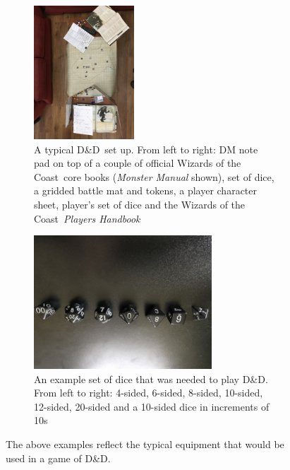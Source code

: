 \documentclass[final]{cmpreport}
\newcommand{\WotC}{Wizards of the Coast}
\newcommand{\dnd}{D\&D}
\begin{document}
			\begin{figure}[h] 
				\begin{subfigure}[t]{0.5\textwidth}
					\includegraphics[width=\linewidth, height=5cm, angle=180]{DnD_Live.jpg}
					\caption{A typical \dnd \ set up. From left to right: DM note pad on top of a couple of official \WotC \ core books (\emph{Monster Manual} shown), set of dice, a gridded battle mat and tokens, a player character sheet, player's set of dice and the \WotC \ \emph{Players Handbook}} \label{fig:DnDLive}
				\end{subfigure}
				\begin{subfigure}[t]{0.5\textwidth}
					\includegraphics[width=\linewidth, height=5cm, angle=180]{DnD_Dice.jpg}
					\caption{An example set of dice that was needed to play \dnd. From left to right: 4-sided, 6-sided, 8-sided, 10-sided, 12-sided, 20-sided and a 10-sided dice in increments of 10s} \label{fig:DnDDice}
				\end{subfigure}
				\caption{The above examples reflect the typical equipment that would be used in a game of \dnd.} \label{fig:dnd-equipment}
			\end{figure}
			
\end{document}
